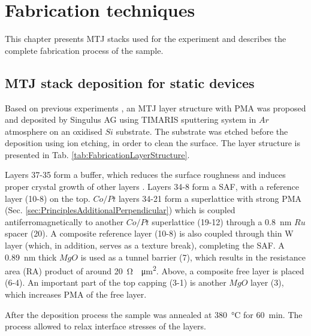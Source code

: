 \chapter{Fabrication techniques}
\label{sec:Fabrication}

This chapter presents MTJ stacks used for the experiment and describes the complete fabrication process of the sample.

\section{MTJ stack deposition for static devices} \label{sec:FabricationStackStatic}

    Based on previous experiments \cite{skowronski2017understanding}, an MTJ layer structure with PMA was proposed and deposited by Singulus AG using TIMARIS sputtering system in $Ar$ atmosphere on an oxidised $Si$ substrate. The substrate was etched before the deposition using ion etching, in order to clean the surface. The layer structure is presented in Tab. \ref{tab:FabricationLayerStructure}. 
    
    Layers 37-35 form a buffer, which reduces the surface roughness and induces proper crystal growth of other layers \cite{banasik2015magnetic}. Layers 34-8 form a SAF, with a reference layer (10-8) on the top. $Co/Pt$ layers 34-21 form a superlattice with strong PMA (Sec. \ref{sec:PrinciplesAdditionalPerpendicular}) which is coupled antiferromagnetically to another $Co/Pt$ superlattice (19-12) through a \SI{0.8}{\nano\meter} $Ru$ spacer (20). A composite reference layer (10-8) is also coupled through thin W layer (which, in addition, serves as a texture break), completing the SAF. A \SI{0.89}{\nano\meter} thick $MgO$ is used as a tunnel barrier (7), which results in the resistance area (RA) product of around \SI{20}{\ohm\times\micro\metre\squared}. Above, a composite free layer is placed (6-4). An important part of the top capping (3-1) is another $MgO$ layer (3), which increases PMA of the free layer.
    
    After the deposition process the sample was annealed at \SI{380}{\celsius} for \SI{60}{\minute}. The process allowed to relax interface stresses of the layers.
    
